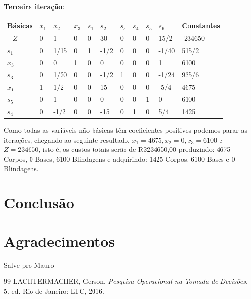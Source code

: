 \documentclass[12pt, a4paper]{article}
\begin{document}
\textbf{Terceira iteração:}
\begin{center}
\begin{tabular}{lllllllllll}
\toprule
Básicas & $x_1$ & $x_2$ & $x_3$ & $s_1$ & $s_2$ & $s_3$ & $s_4$ & $s_5$ & $s_6$ & Constantes \\
\midrule
$-Z$ & 0 & 1 & 0 & 0 & 30 & 0 & 0 & 0 & 15/2 & -234650 \\
$s_1$ & 0 & 1/15 & 0 & 1 & -1/2 & 0 & 0 & 0 & -1/40 & 515/2 \\
$x_3$ & 0 & 0 & 1 & 0 & 0 & 0 & 0 & 0 & 1 & 6100 \\
$s_3$ & 0 & 1/20 & 0 & 0 & -1/2 & 1 & 0 & 0 & -1/24 & 935/6 \\
$x_1$ & 1 & 1/2 & 0 & 0 & 15 & 0 & 0 & 0 & -5/4 & 4675 \\
$s_5$ & 0 & 1 & 0 & 0 & 0 & 0 & 0 & 1 & 0 & 6100 \\
$s_4$ & 0 & -1/2 & 0 & 0 & -15 & 0 & 1 & 0 & 5/4 & 1425 \\
\bottomrule
\end{tabular}
\end{center}

Como todas as variáveis não básicas têm coeficientes positivos podemos parar as iterações, chegando ao seguinte resultado, $x_1 = 4675, x_2 = 0, x_3 = 6100$ e $Z = 234650$, isto é, os custos totais serão de R\$234650,00 produzindo: 4675 Corpos, 0 Bases, 6100 Blindagens e adquirindo: 1425 Corpos, 6100 Bases e 0 Blindagens.

\cleardoublepage
\section{Conclusão}
\section*{Agradecimentos}
Salve pro Mauro

\begin{thebibliography}{99}
 LACHTERMACHER, Gerson. \textit{Pesquisa Operacional na Tomada de Decisões}. 5. ed. Rio de Janeiro: LTC, 2016.
\end{thebibliography}
\end{document}
